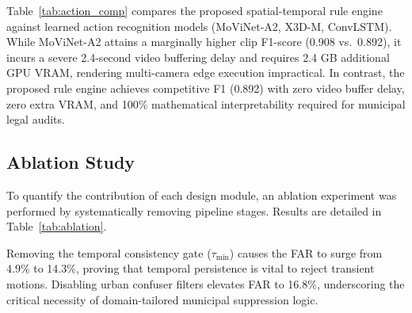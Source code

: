\documentclass[conference]{IEEEtran}
\begin{document}
Table~\ref{tab:action_comp} compares the proposed spatial-temporal rule engine against learned action recognition models (MoViNet-A2, X3D-M, ConvLSTM). While MoViNet-A2 attains a marginally higher clip F1-score (0.908 vs.\ 0.892), it incurs a severe 2.4-second video buffering delay and requires 2.4 GB additional GPU VRAM, rendering multi-camera edge execution impractical. In contrast, the proposed rule engine achieves competitive F1 (0.892) with zero video buffer delay, zero extra VRAM, and 100\% mathematical interpretability required for municipal legal audits.

\subsection{Ablation Study}

To quantify the contribution of each design module, an ablation experiment was performed by systematically removing pipeline stages. Results are detailed in Table~\ref{tab:ablation}.

\begin{table}[htbp]
\centering
\caption{Ablation Study: Component Contributions}
\label{tab:ablation}
\end{table}

Removing the temporal consistency gate ($\tau_{\min}$) causes the FAR to surge from 4.9\% to 14.3\%, proving that temporal persistence is vital to reject transient motions. Disabling urban confuser filters elevates FAR to 16.8\%, underscoring the critical necessity of domain-tailored municipal suppression logic.
\end{document}
